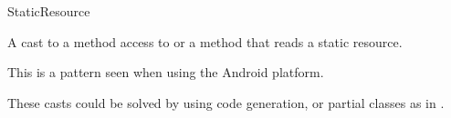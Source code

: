 
\begin{pattern}{StaticResource}
    
A cast to a method access to  or a method that reads a
static resource.

This is a pattern seen when using the Android platform. 



\discussion

These casts could be solved by using code generation,
or partial classes as in \cs.

\end{pattern}